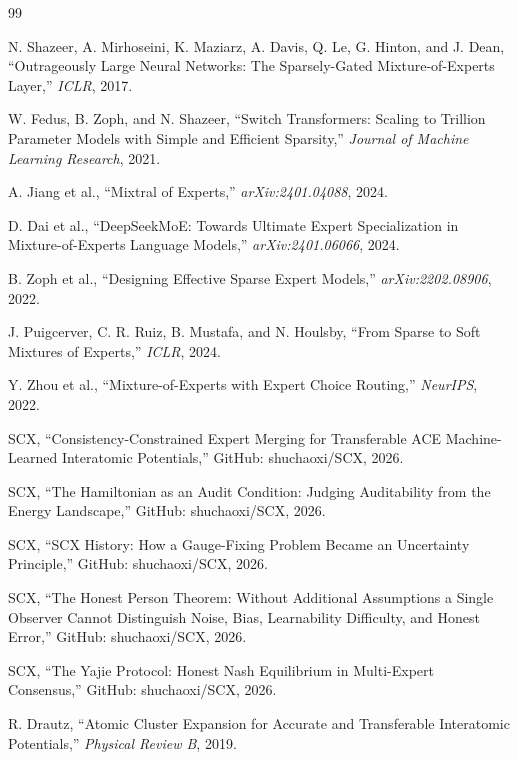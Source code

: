 \documentclass[12pt,a4paper]{article}
\theoremstyle{remark}
\begin{document}
% 
\begin{thebibliography}{99}

N. Shazeer, A. Mirhoseini, K. Maziarz, A. Davis, Q. Le, G. Hinton, and J. Dean,
``Outrageously Large Neural Networks: The Sparsely-Gated Mixture-of-Experts Layer,''
\textit{ICLR}, 2017.

W. Fedus, B. Zoph, and N. Shazeer,
``Switch Transformers: Scaling to Trillion Parameter Models with Simple and Efficient Sparsity,''
\textit{Journal of Machine Learning Research}, 2021.

A. Jiang et al.,
``Mixtral of Experts,''
\textit{arXiv:2401.04088}, 2024.

D. Dai et al.,
``DeepSeekMoE: Towards Ultimate Expert Specialization in Mixture-of-Experts Language Models,''
\textit{arXiv:2401.06066}, 2024.

B. Zoph et al.,
``Designing Effective Sparse Expert Models,''
\textit{arXiv:2202.08906}, 2022.

J. Puigcerver, C. R. Ruiz, B. Mustafa, and N. Houlsby,
``From Sparse to Soft Mixtures of Experts,''
\textit{ICLR}, 2024.

Y. Zhou et al.,
``Mixture-of-Experts with Expert Choice Routing,''
\textit{NeurIPS}, 2022.

SCX,
``Consistency-Constrained Expert Merging for Transferable ACE Machine-Learned Interatomic Potentials,''
GitHub: shuchaoxi/SCX, 2026.

SCX,
``The Hamiltonian as an Audit Condition: Judging Auditability from the Energy Landscape,''
GitHub: shuchaoxi/SCX, 2026.

SCX,
``SCX History: How a Gauge-Fixing Problem Became an Uncertainty Principle,''
GitHub: shuchaoxi/SCX, 2026.

SCX,
``The Honest Person Theorem: Without Additional Assumptions a Single Observer Cannot Distinguish Noise, Bias, Learnability Difficulty, and Honest Error,''
GitHub: shuchaoxi/SCX, 2026.

SCX,
``The Yajie Protocol: Honest Nash Equilibrium in Multi-Expert Consensus,''
GitHub: shuchaoxi/SCX, 2026.

R. Drautz,
``Atomic Cluster Expansion for Accurate and Transferable Interatomic Potentials,''
\textit{Physical Review B}, 2019.


\end{thebibliography}
\end{document}
